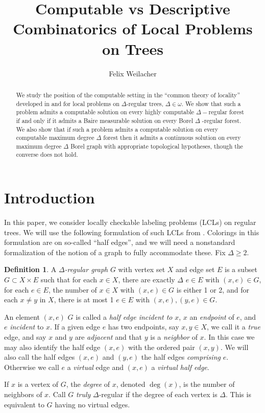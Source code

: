 \documentclass[11pt]{amsart}
\title{Computable vs Descriptive Combinatorics of Local Problems on Trees}
\author{Felix Weilacher}
\theoremstyle{definition}
\newtheorem{definition}[theorem]{Definition}
\begin{document}
\maketitle

\begin{abstract}
    We study the position of the computable setting in the ``common theory of locality'' developed in \cite{G+_trees} and \cite{BCG_Trees2} for local problems on $\Delta$-regular trees, $\Delta \in \omega$. We show that such a problem admits a computable solution on every highly computable $\Delta-$regular forest if and only if it admits a Baire measurable solution on every Borel $\Delta$ -regular forest. We also show that if such a problem admits a computable solution on every computable maximum degree $\Delta$ forest then it admits a continuous solution on every maximum degree $\Delta$ Borel graph with appropriate topological hypotheses, though the converse does not hold.
\end{abstract}


\section{Introduction}

In this paper, we consider locally checkable labeling problems (LCLs) on regular trees. We will use the following formulation of such LCLs from \cite{G+_trees}. Colorings in this formulation are on so-called ``half edges'', and we will need a nonstandard formalization of the notion of a graph to fully accommodate these. Fix $\Delta \geq 2$.

\begin{definition}\label{def:graph}
    A \textit{$\Delta$-regular graph} $G$ with vertex set $X$ and edge set $E$ is a subset $G \subset X \times E$ such that for each $x \in X$, there are exactly $\Delta$ $e \in E$ with $(x,e) \in G$, for each $e \in E$, the number of $x \in X$ with $(x,e) \in G$ is either 1 or 2, and for each $x \neq y$ in $X$, there is at most 1 $e \in E$ with $(x,e),(y,e) \in G$.
    
    An element $(x,e)$ $G$ is called a \textit{half edge incident to} $x$, $x$ an \textit{endpoint} of $e$, and $e$ \textit{incident} to $x$. If a given edge $e$ has two endpoints, say $x,y \in X$, we call it a \textit{true} edge, and say $x$ and $y$ are \textit{adjacent} and that $y$ is a \textit{neighbor} of $x$. In this case we may also identify the half edge $(x,e)$ with the ordered pair $(x,y)$. We will also call the half edges $(x,e)$ and $(y,e)$ the half edges \textit{comprising} $e$. Otherwise we call $e$ a \textit{virtual} edge and $(x,e)$ a \textit{virtual half edge}.
    
    If $x$ is a vertex of $G$, the \textit{degree} of $x$, denoted $\deg(x)$, is the number of neighbors of $x$. Call $G$ \textit{truly} $\Delta$-regular if the degree of each vertex is $\Delta$. This is equivalent to $G$ having no virtual edges.
\end{definition}
\end{document}
